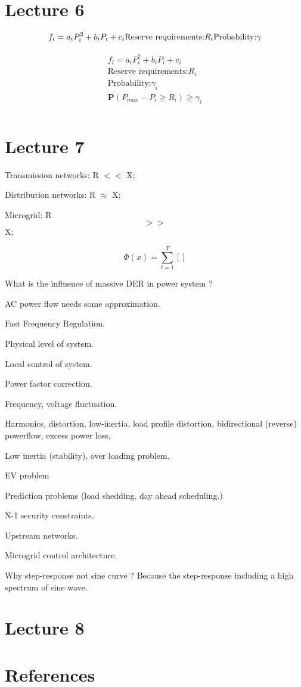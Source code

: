 \documentclass{article}
\begin{document}
\section{Lecture 6}

$$
f_i = a_i P_i^2 + b_i P_i + c_i \\
\text{Reserve requirements:} R_i \\
\text{Probability:} \gamma \\
$$

\begin{eqnarray}
  \begin{aligned}
    f_i = a_i P_i^2 + b_i P_i + c_i \\ 
    \text{Reserve requirements:} R_i \\
    \text{Probability:} \gamma_i \\
  \mathbf{P}(P_{max} - P_i \geq R_i) \geq \gamma_i \\
  \end{aligned}
\end{eqnarray}

\section{Lecture 7}

Transmission networks: R $<<$ X;

Distribution networks: R $\approx $ X;

Microgrid: R $$>>$$ X;

$$
\Phi(x) = \sum_{t=1}^T []
$$

What is the influence of massive DER in power system ?

AC power flow needs some approximation.

Fast Frequency Regulation.

Physical level of system.

Local control of system.

Power factor correction.

Frequency, voltage fluctuation.

Harmonics, distortion, low-inertia, load profile distortion, bidirectional (reverse) powerflow, excess power loss,

Low inertia (stability), over loading problem.

EV problem

Prediction problems (load shedding, day ahead scheduling.)

N-1 security constraints.

Upstream networks.

Microgrid control architecture. 

Why step-response not sine curve ?
Because the step-response including a high spectrum of sine wave.


\section{Lecture 8}



\section*{References}

\medskip

\small
\end{document}
